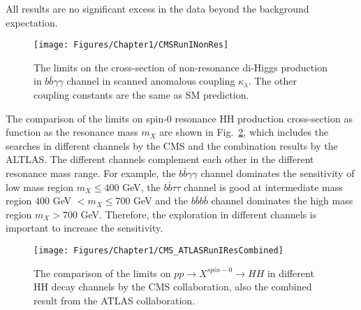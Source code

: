 All results are no significant excess in the data beyond the background expectation.

\begin{figure}[h]
  \centering
  \texttt{[image: Figures/Chapter1/CMSRunINonRes]}
  \caption{The limits on the cross-section of non-resonance di-Higgs production in $b\bar{b}\gamma\gamma$ channel in scanned anomalous coupling $\kappa_{\lambda}$. The other coupling constants are the same as SM prediction.~\cite{1603.06896}}
  \label{fig:CMSRunINonRes}
\end{figure}


The comparison of the limits on spin-0 resonance HH production cross-section as function as the resonance mass $m_{X}$ are shown in Fig.~\ref{fig:CMS_ATLASRunIResCombined}, which includes the searches in different channels by the CMS and the combination results by the ALTLAS.
The different channels complement each other in the different resonance mass range.
For example, the $b\bar{b}\gamma\gamma$ channel dominates the sensitivity of low mass region $m_{X}\leq 400$ GeV, the $b\bar{b}\tau\tau$ channel is good at intermediate mass region $400$ GeV $< m_{X} \leq 700$ GeV and the $b\bar{b}b\bar{b}$ channel dominates the high mass region $m_{X}>700$ GeV.
Therefore, the exploration in different channels is important to increase the sensitivity.

\begin{figure}[h]
  \centering
  \texttt{[image: Figures/Chapter1/CMS\_ATLASRunIResCombined]}
  \caption{The comparison of the limits on $pp \rightarrow X^{spin-0} \rightarrow HH$ in different HH decay channels by the CMS collaboration, also the combined result from the ATLAS collaboration. ~\cite{1610.07922}}
  \label{fig:CMS_ATLASRunIResCombined}
\end{figure}
